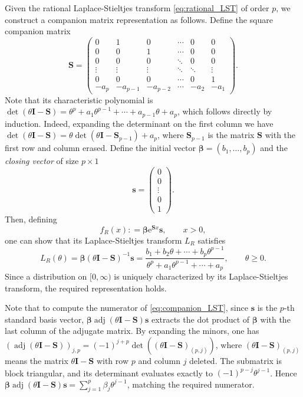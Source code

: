 \documentclass[a4paper,11pt]{article}
\numberwithin{equation}{section}
\theoremstyle{plain}
\theoremstyle{definition}
\newcommand{\1}{\mathbf{1}}
\newcommand{\e}{\mathrm{e}}
\begin{document}
Given the rational Laplace-Stieltjes transform \eqref{eq:rational_LST} of order $p$, we construct a companion matrix representation as follows. Define the square companion matrix
\begin{equation}\label{eq:companion_S}
\bm{S} = \begin{pmatrix}
0 & 1 & 0 & \cdots & 0 & 0 \\
0 & 0 & 1 & \cdots & 0 & 0 \\
0 & 0 & 0 & \ddots & 0 & 0 \\
\vdots & \vdots & \vdots & \ddots & \ddots & \vdots \\
0 & 0 & 0 & \cdots & 0 & 1 \\
-a_p & -a_{p-1} & -a_{p-2} &  \cdots & -a_2 & -a_1
\end{pmatrix}.
\end{equation}
Note that its characteristic polynomial is $\det(\theta \bm{I} - \bm{S}) = \theta^p + a_1\theta^{p-1} + \cdots + a_{p-1}\theta + a_p$, which follows directly by induction. 
Indeed, expanding the determinant on the first column we have $\det(\theta \bm{I} - \bm{S})=\theta \det(\theta \bm{I} - \bm{S}_{p-1})+a_p$, where $\bm{S}_{p-1}$ is the matrix $\bm{S}$ with the first row and column erased. 
Define the initial vector $\bm{\beta} = (b_1, \ldots, b_p)$ and the \emph{closing vector} of size $p\times 1$
\begin{equation}\label{eq:s_vector}
\bm{s} = \begin{pmatrix}
0 \\
0 \\
\vdots \\
0 \\
1
\end{pmatrix}.
\end{equation}
Then, defining
\begin{equation}\label{eq:companion_density}
f_R(x): = \bm{\beta} \e^{\bm{S}x} \bm{s}, \qquad x > 0,
\end{equation}one can show that its Laplace-Stieltjes transform $L_R$ satisfies \begin{equation}\label{eq:companion_LST}
L_R(\theta)=\bm{\beta}(\theta \bm{I} - \bm{S})^{-1}\bm{s} = \frac{b_1 + b_2\theta + \cdots + b_p\theta^{p-1}}{\theta^p + a_1\theta^{p-1} + \cdots + a_p},\qquad \mbox{$\theta\geq 0$}.
\end{equation}
Since a distribution on $[0,\infty)$ is uniquely characterized by its Laplace-Stieltjes transform, the required representation holds.


Note that to compute the numerator of \eqref{eq:companion_LST}, since $\bm{s}$ is the $p$-th standard basis vector, $\bm{\beta}\operatorname{adj}(\theta \bm{I} - \bm{S})\bm{s}$ extracts the dot product of $\bm{\beta}$ with the last column of the adjugate matrix. By expanding the minors, one has $(\operatorname{adj}(\theta \bm{I} - \bm{S}))_{j,p} = (-1)^{j+p}\det((\theta \bm{I} - \bm{S})_{(p,j)})$, where $(\theta \bm{I} - \bm{S})_{(p,j)}$ means the matrix $\theta \bm{I}-\bm S$ with row $p$ and column $j$ deleted. The submatrix is block triangular, and its determinant evaluates exactly to $(-1)^{p-j}\theta^{j-1}$. Hence $\bm{\beta}\operatorname{adj}(\theta \bm{I} - \bm{S})\bm{s}=\sum_{j=1}^p \beta_j\theta^{j-1}$, matching the required numerator.
\end{document}
